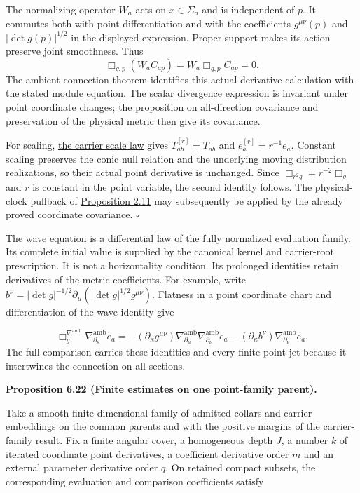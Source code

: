 \documentclass[
  english,
  11pt,
  reqno]{amsart}
\makeatletter
\newcommand{\pandocstatementheading}[1]{%
  \par\addpenalty{\@beginparpenalty}%
  \addvspace{.5\baselineskip plus .2\baselineskip minus .2\baselineskip}%
  {\normalfont\bfseries #1\par}%
  \nobreak\@afterindenttrue\@afterheading
}
\makeatother
\begin{document}
The normalizing operator \(W_a\) acts on \(x\in\Sigma_a\) and is
independent of \(p\). It commutes both with point differentiation and
with the coefficients \(g^{\mu\nu}(p)\) and \(|\det g(p)|^{1/2}\) in the
displayed expression. Proper support makes its action preserve joint
smoothness. Thus \[
\Box_{g,p}(W_aC_{ap})
=W_a\Box_{g,p}C_{ap}=0.
\] The ambient-connection theorem identifies this actual derivative
calculation with the stated module equation. The scalar divergence
expression is invariant under point coordinate changes; the proposition
on all-direction covariance and preservation of the physical metric then
give its covariance.

For scaling, \hyperref[prop:online-wave-carrier-families-scale]{the
carrier scale law} gives \(T_{ab}^{[r]}=T_{ab}\) and
\(e_a^{[r]}=r^{-1}e_a\). Constant scaling preserves the conic null
relation and the underlying moving distribution realizations, so their
actual point derivative is unchanged. Since \(\Box_{r^2g}=r^{-2}\Box_g\)
and \(r\) is constant in the point variable, the second identity
follows. The physical-clock pullback of
\hyperref[prop:online-cartan-physical-scale]{Proposition 2.11} may
subsequently be applied by the already proved coordinate covariance.
\hfill\(\square\)

The wave equation is a differential law of the fully normalized
evaluation family. Its complete initial value is supplied by the
canonical kernel and carrier-root prescription. It is not a
horizontality condition. Its prolonged identities retain derivatives of
the metric coefficients. For example, write
\(b^\nu=|\det g|^{-1/2}\partial_\mu(|\det g|^{1/2}g^{\mu\nu})\).
Flatness in a point coordinate chart and differentiation of the wave
identity give

\label{eq:online-evaluation-prolonged-wave-equation} \[
\Box_g^{\nabla^{\mathrm{amb}}}
   \nabla^{\mathrm{amb}}_{\partial_\kappa}e_a
=-(\partial_\kappa g^{\mu\nu})
    \nabla^{\mathrm{amb}}_{\partial_\mu}
    \nabla^{\mathrm{amb}}_{\partial_\nu}e_a
  -(\partial_\kappa b^\nu)
    \nabla^{\mathrm{amb}}_{\partial_\nu}e_a.
\] The full comparison carries these identities and every finite point
jet because it intertwines the connection on all sections.

\pandocstatementheading{\leavevmode{}\label{prop:online-point-connection-finite-families}Proposition 6.22 (Finite estimates on one point-family parent).}

Take a smooth finite-dimensional family of admitted collars and carrier
embeddings on the common parents and with the positive margins of
\hyperref[prop:online-wave-carrier-families-scale]{the carrier-family
result}. Fix a finite angular cover, a homogeneous depth \(J\), a number
\(k\) of iterated coordinate point derivatives, a coefficient derivative
order \(m\) and an external parameter derivative order \(q\). On
retained compact subsets, the corresponding evaluation and comparison
coefficients satisfy
\end{document}
